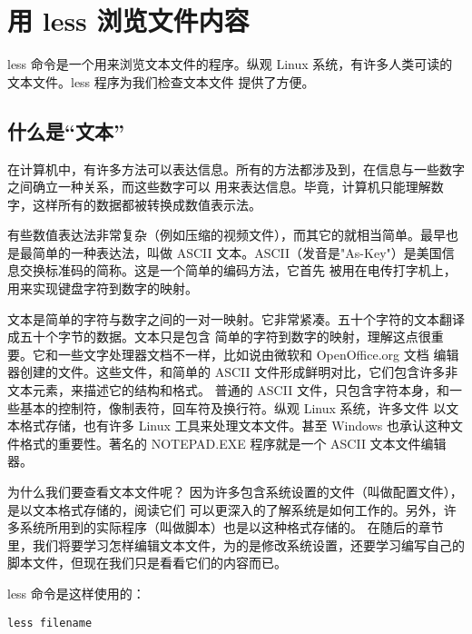 \section{用 less 浏览文件内容} %
\label{sec:用_less_浏览文件内容}

less 命令是一个用来浏览文本文件的程序。纵观 Linux 系统，有许多人类可读的文本文件。less 程序为我们检查文本文件 提供了方便。

\fboxrule=6pt \fboxsep=4pt
\begin{colorboxed}[boxcolor=lightgray,bgcolor=white]
\subsection{什么是``文本''}
在计算机中，有许多方法可以表达信息。所有的方法都涉及到，在信息与一些数字之间确立一种关系，而这些数字可以 用来表达信息。毕竟，计算机只能理解数字，这样所有的数据都被转换成数值表示法。

\par 有些数值表达法非常复杂（例如压缩的视频文件），而其它的就相当简单。最早也是最简单的一种表达法，叫做 ASCII 文本。ASCII（发音是"As-Key"）是美国信息交换标准码的简称。这是一个简单的编码方法，它首先 被用在电传打字机上，用来实现键盘字符到数字的映射。

\par 文本是简单的字符与数字之间的一对一映射。它非常紧凑。五十个字符的文本翻译成五十个字节的数据。文本只是包含 简单的字符到数字的映射，理解这点很重要。它和一些文字处理器文档不一样，比如说由微软和 OpenOffice.org 文档 编辑器创建的文件。这些文件，和简单的 ASCII 文件形成鲜明对比，它们包含许多非文本元素，来描述它的结构和格式。 普通的 ASCII 文件，只包含字符本身，和一些基本的控制符，像制表符，回车符及换行符。纵观 Linux 系统，许多文件 以文本格式存储，也有许多 Linux 工具来处理文本文件。甚至 Windows 也承认这种文件格式的重要性。著名的 NOTEPAD.EXE 程序就是一个 ASCII 文本文件编辑器。
\end{colorboxed}

\par 为什么我们要查看文本文件呢？ 因为许多包含系统设置的文件（叫做配置文件），是以文本格式存储的，阅读它们 可以更深入的了解系统是如何工作的。另外，许多系统所用到的实际程序（叫做脚本）也是以这种格式存储的。 在随后的章节里，我们将要学习怎样编辑文本文件，为的是修改系统设置，还要学习编写自己的脚本文件，但现在我们只是看看它们的内容而已。

\par less 命令是这样使用的：

\begin{lstlisting}
less filename
\end{lstlisting}

